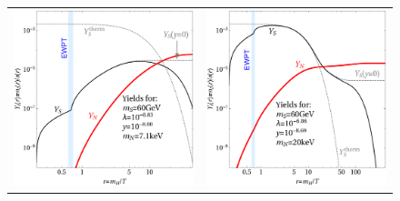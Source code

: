\begin{figure}[t!]
\begin{tabular}{cc}
 \hspace{-1cm}\includegraphics[width=7.9cm]{figures/yield60FIMP.pdf} & \includegraphics[width=7.9cm]{figures/yield60WIMP.pdf}\\

\end{tabular}
\end{figure}
